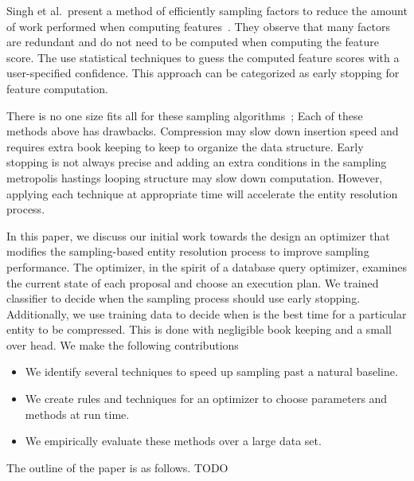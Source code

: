 Singh et al.\ present a method of efficiently sampling factors to reduce the
amount of work performed when computing features~\cite{singh2012monte}.
They observe that many factors are redundant and do not need to be computed when
computing the feature score.
The use statistical techniques to guess the computed feature scores with a user-specified confidence.
This approach can be categorized as early stopping for feature computation.

There is no one size fits all for these sampling algorithms~\cite{sculley2006compression};
Each of these methods above has drawbacks.
Compression may slow down insertion speed and requires extra book keeping to keep to organize the data structure.
Early stopping is not always precise and adding an extra conditions in the sampling metropolis hastings looping structure may slow down computation.
However, applying each technique at appropriate time will accelerate the entity resolution process.

In this paper, we discuss our initial work towards the design an optimizer that modifies the
sampling-based entity resolution process to improve sampling performance.
The optimizer, in the spirit of a database query optimizer, examines the
current state of each proposal and choose an execution plan.
We trained classifier to decide when the sampling process should use early stopping.
Additionally, we use training data to decide when is the best time for a particular entity to be compressed.
This is done with negligible book keeping and a small over head.
We make the following contributions
\begin{itemize}
\item We identify several techniques to speed up sampling past a natural baseline.
\item We create rules and techniques for an optimizer to choose parameters and methods at run time.
\item We empirically evaluate these methods over a large data set.
\end{itemize}

The outline of the paper is as follows.
TODO



